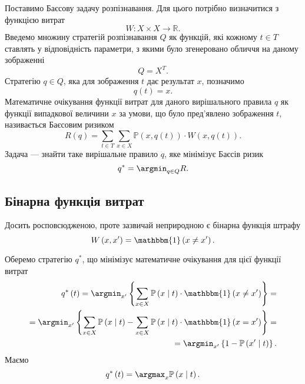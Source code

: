 Поставимо Баєсову задачу розпізнавання.
Для цього потрібно визначитися з функцією витрат
\cite{berger1980}
\begin{equation*}
  W: X \times X \rightarrow \mathbb{R}.
\end{equation*}
Введемо множину стратегій розпізнавання $Q$ як функцій,
які кожному $t \in T$ ставлять у відповідність параметри,
з якими було згенеровано обличчя на даному зображенні
\begin{equation*}
  Q = X^T.
\end{equation*}
Стратегію $q \in Q$, яка для зображення $t$ дає результат $x$, позначимо
\begin{equation*}
  q\left( t \right) = x.
\end{equation*}
Математичне очікування функції витрат для даного вирішального правила $q$
як функції випадкової величини $x$ за умови,
що було пред'явлено зображення $t$, називається Баєсовим ризиком
\begin{equation*}
  R \left( q \right)
  = \sum\limits_{t \in T} \sum\limits_{x \in X}
    \mathbb{P} \left( x,  q\left( t \right) \right)
    \cdot W \left( x, q\left( t \right) \right).
\end{equation*}
Задача --- знайти таке вирішальне правило $q$, яке мінімізує Баєсів ризик
\begin{equation*}
  q^* = \argmin_{q \in Q} R.
\end{equation*}

\subsection{Бінарна функція витрат}

Досить росповсюдженою, проте зазвичай неприродною є бінарна функція штрафу
\begin{equation*}
  W \left( x, x' \right)
  = \mathbbm{1} \left( x \neq x' \right).
\end{equation*}

Оберемо стратегію $q^*$,
що мінімізує математичне очікування для цієї функції витрат
\begin{equation*}
  \begin{split}
    q^* \left( t \right)
    = \argmin_{x'} \left\{
      \sum\limits_{x \in X}
        \mathbb{P} \left( x \;\middle|\;  t \right)
        \cdot \mathbbm{1} \left( x \neq x' \right)
      \right\} = \\
    = \argmin_{x'} \left\{
      \sum\limits_{x \in X}
        \mathbb{P} \left( x \;\middle|\;  t \right)
      - \sum\limits_{x \in X}
        \mathbb{P} \left( x \;\middle|\;  t \right)
        \cdot \mathbbm{1} \left( x = x' \right)
      \right\} = \\
    = \argmin_{x'} \left\{
      1 - \mathbb{P} \left( x' \;\middle|\;  t \right)
      \right\}.
  \end{split}
\end{equation*}
Маємо
\begin{equation*}
  q^* \left( t \right)
  = \argmax_x \mathbb{P} \left( x \;\middle|\;  t \right).
\end{equation*}

